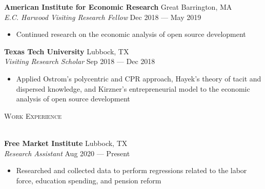 \documentclass[a4paper]{article}
\newcommand{\lineunder} {
    \vspace*{-8pt} \\
    \hspace*{-18pt} \hrulefill \\
}
\newcommand{\header} [1] {
    {\hspace*{-18pt}\vspace*{6pt} \textsc{\large{#1}}}
    \vspace*{-6pt} \lineunder
}
\begin{document}
\textbf{American Institute for Economic Research} \hfill Great Barrington, MA\\
\textit{E.C. Harwood Visiting Research Fellow} \hfill Dec 2018 --- May 2019\\
\begin{itemize}[noitemsep,nolistsep]
	\item Continued research on the economic analysis of open source development
\end{itemize}
\vspace{1mm}
\textbf{Texas Tech University} \hfill Lubbock, TX\\
\textit{Visiting Research Scholar} \hfill Sep 2018 --- Dec 2018\\
\begin{itemize}[noitemsep,nolistsep]
	\item Applied Ostrom's polycentric and CPR approach, Hayek's theory of tacit and dispersed knowledge, and Kirzner's entrepreneurial model to the economic analysis of open source development
\end{itemize}
\vspace{2mm}

\header{Work Experience}
\vspace{1mm}

\textbf{Free Market Institute} \hfill Lubbock, TX\\
\textit{Research Assistant} \hfill Aug 2020 --- Present \\
\begin{itemize}[noitemsep,nolistsep]
	\item Researched and collected data to perform regressions related to the labor force, education spending, and pension reform
\end{itemize}
\vspace{1mm}
\end{document}
